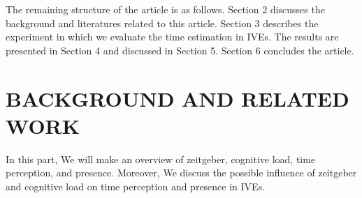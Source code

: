 \documentclass[sigconf]{acmart}
\begin{document}
The remaining structure of the article is as follows. Section 2 discusses the background and literatures related to this article. Section 3 describes the experiment in which we evaluate the time estimation in IVEs. The results are presented in Section 4 and discussed in Section 5. Section 6 concludes the article.



\section{BACKGROUND AND RELATED WORK}\label{chap:backgound}



In this part, We will make an overview of zeitgeber, cognitive load, time perception, and presence. Moreover, We discuss the possible influence of zeitgeber and cognitive load on time perception and presence in IVEs. %
\end{document}
